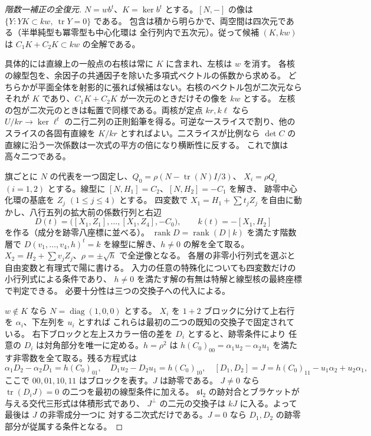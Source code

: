 \begin{proof}[階数一補正の全復元]
$N=w b^t$、$K=\ker b^t$ とする。$[N,-]$ の像は
$\{Y:Y K\subset kw,\ \operatorname{tr}Y=0\}$ である。
包含は積から明らかで、両空間は四次元である（半単純型も冪零型も中心化環は
全行列内で五次元）。従って候補 $(K,kw)$ は $C_1K+C_2K\subset kw$ の全解である。

具体的には直線上の一般点の右核は常に $K$ に含まれ、左核は $w$ を消す。
各核の線型包を、余因子の共通因子を除いた多項式ベクトルの係数から求める。
どちらかが平面全体を射影的に張れば候補はない。右核のベクトル包が二次元なら
それが $K$ であり、$C_1K+C_2K$ が一次元のときだけその像を $kw$ とする。
左核の包が二次元のときは転置で同様である。両核が定点 $kr,k\ell$ なら
$U/kr\to\ker\ell^t$ の二行二列の正則鉛筆を得る。可逆な一スライスで割り、他の
スライスの各固有直線を $K/kr$ とすればよい。二スライスが比例なら
$\det C$ の直線に沿う一次係数は一次式の平方の倍になり横断性に反する。
これで旗は高々二つである。

旗ごとに $N$ の代表を一つ固定し、$Q_0=\rho(N-\operatorname{tr}(N)I/3)$、
$X_i=\rho Q_i$ $(i=1,2)$ とする。線型に $[N,H_1]=C_2$、$[N,H_2]=-C_1$ を解き、
跡零中心化環の基底を $Z_j$ $(1\le j\le4)$ とする。
四変数で $X_1=H_1+\sum t_j Z_j$ を自由に動かし、八行五列の拡大前の係数行列と右辺
\[
       D(t)=\big([X_1,Z_1],\ldots,[X_1,Z_4],-C_0\big),
              \qquad k(t)=-[X_1,H_2]
\]
を作る（成分を跡零八座標に並べる）。
$\operatorname{rank}D=\operatorname{rank}(D\mid k)$ を満たす階数層で
$D(v_1,\ldots,v_4,h)^t=k$ を線型に解き、$h\ne0$ の解を全て取る。
$X_2=H_2+\sum v_j Z_j$、$\rho=\pm\sqrt h$ で全逆像となる。
各層の非零小行列式を選ぶと自由変数と有理式で陽に書ける。
入力の任意の特殊化についても四変数だけの小行列式による条件であり、
$h\ne0$ を満たす解の有無は特解と線型核の最終座標で判定できる。
必要十分性は三つの交換子への代入による。

$w\notin K$ なら $N=\operatorname{diag}(1,0,0)$ とする。
$X_i$ を $1+2$ ブロックに分けて上右行を $\alpha_i$、下左列を $u_i$ とすれば
これらは最初の二つの既知の交換子で固定されている。
右下ブロックと左上スカラー倍の差を $D_i$ とすると、跡零条件により
任意の $D_i$ は対角部分を唯一に定める。$h=\rho^2$ は
$h(C_0)_{00}=\alpha_1u_2-\alpha_2u_1$ を満たす非零数を全て取る。残る方程式は
\[
 \alpha_1D_2-\alpha_2D_1=h(C_0)_{01},\quad
 D_1u_2-D_2u_1=h(C_0)_{10},\quad
 [D_1,D_2]=J=h(C_0)_{11}-u_1\alpha_2+u_2\alpha_1 ,
\]
ここで $00,01,10,11$ はブロックを表す。$J$ は跡零である。
$J\ne0$ なら $\operatorname{tr}(D_iJ)=0$ の二つを最初の線型条件に加える。
$\mathfrak{sl}_2$ の跡対合とブラケットが与える交代三形式は体積形式であり、
$J^\perp$ の二元の交換子は $kJ$ に入る。よって最後は $J$ の非零成分一つに
対する二次式だけである。$J=0$ なら $D_1,D_2$ の跡零部分が従属する条件となる。


\end{proof}
